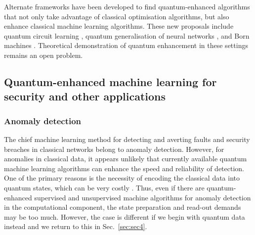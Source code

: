 \documentclass[twocolumn, aps, rmp, amsmath, amssymb, nofootinbib, superscriptaddress, longbibliography, floatfix, table-of-contents, eqsecnum]{revtex4}
\begin{document}
Alternate frameworks have been developed to find quantum-enhanced algorithms that not only take advantage of classical optimisation algorithms, but also enhance classical machine learning algorithms. These new proposals include quantum circuit learning \cite{bib:mitarai2018quantum}, quantum generalisation of neural networks \cite{wan2017quantum}, and Born machines \cite{bib:cheng2018information, bib:benedetti2018generative}. Theoretical demonstration of quantum enhancement in these settings remains an open problem.





\subsection{Quantum-enhanced machine learning for security and other applications}

\subsubsection{Anomaly detection}

The chief machine learning method for detecting and averting faults and security breaches in classical networks belong to anomaly detection. However, for anomalies in classical data, it appears unlikely that currently available quantum machine learning algorithms can enhance the speed and reliability of detection. One of the primary reasons is the necessity of encoding the classical data into quantum states, which can be very costly \cite{bib:aaronson2015read}. Thus, even if there are quantum-enhanced supervised and unsupervised machine algorithms for anomaly detection in the computational component, the state preparation and read-out demands may be too much. However, the case is different if we begin with quantum data instead and we return to this in Sec.~\ref{sec:sec4}.
\end{document}
